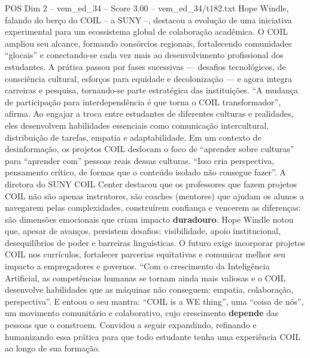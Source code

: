 \begin{textsample}{POS Dim 2 – vem\_ed\_34 – Score 3.00 – vem\_ed\_34/t182.txt}
Hope Windle, falando do berço do COIL – a SUNY –, destacou a evolução de uma iniciativa experimental para um ecossistema global de colaboração acadêmica.
O COIL ampliou seu alcance, formando consórcios regionais, fortalecendo comunidades “glocais” e conectando-se cada vez mais ao desenvolvimento profissional dos estudantes.
A prática passou por fases sucessivas — desafios tecnológicos, de consciência cultural, esforços para equidade e decolonização — e agora integra carreiras e pesquisa, tornando-se parte estratégica das instituições. “A mudança de participação para interdependência é que torna o COIL transformador”, afirma.
Ao engajar a troca entre estudantes de diferentes culturas e realidades, eles desenvolvem habilidades essenciais como comunicação intercultural, distribuição de tarefas, empatia e adaptabilidade.
Em um contexto de desinformação, os projetos COIL deslocam o foco de “aprender sobre culturas” para “aprender com” pessoas reais dessas culturas. “Isso cria perspectiva, pensamento crítico, de formas que o conteúdo isolado não consegue fazer”.
A diretora do SUNY COIL Center destacou que os professores que fazem projetos COIL não são apenas instrutores, são coaches (mentores) que ajudam os alunos a navegarem pelas complexidades, construírem confiança e vencerem as diferenças: são dimensões emocionais que criam impacto \textbf{duradouro}.
Hope Windle notou que, apesar de avanços, persistem desafios: visibilidade, apoio institucional, desequilíbrios de poder e barreiras linguísticas.
O futuro exige incorporar projetos COIL nos currículos, fortalecer parcerias equitativas e comunicar melhor seu impacto a empregadores e governos. “Com o crescimento da Inteligência Artificial, as competências humanas se tornam ainda mais valiosas e o COIL desenvolve habilidades que as máquinas não conseguem: empatia, colaboração, perspectiva”.
E entoou o seu mantra: “COIL is a WE thing”, uma “coisa de nós”, um movimento comunitário e colaborativo, cujo crescimento \textbf{depende} das pessoas que o constroem.
Convidou a seguir expandindo, refinando e humanizando essa prática para que todo estudante tenha uma experiência COIL ao longo de sua formação.

\end{textsample}

